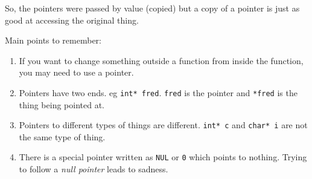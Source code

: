 So, the pointers were passed by value (copied) but a copy of a pointer is just as good at accessing the original thing.

Main points to remember:
\begin{enumerate}
 \item If you want to change something outside a function from inside the function, you may need to use a pointer.
 \item Pointers have two ends. eg \lstinline!int* fred!.   \texttt{fred} is the pointer and \texttt{*fred} is the thing 
 being pointed at.
 \item Pointers to different types of things are different. \texttt{int* c} and \texttt{char* i} are not the same type of thing.
 \item There is a special pointer written as \texttt{NUL} or \texttt{0} which points to nothing.
 Trying to follow a \emph{null pointer} leads to sadness.
\end{enumerate}






